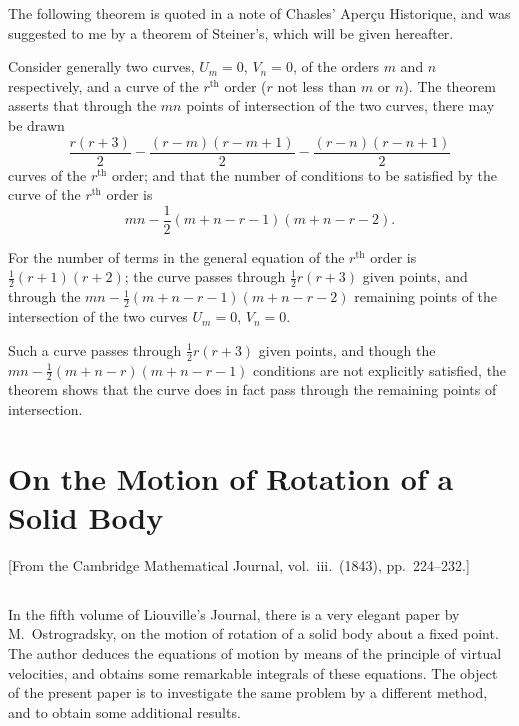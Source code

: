 \documentclass[11pt,a4paper]{book}
\theoremstyle{plain}
\theoremstyle{definition}
\theoremstyle{remark}
\begin{document}
The following theorem is quoted in a note of Chasles' Aper\c{c}u Historique, and was suggested to me by a theorem of Steiner's, which will be given hereafter.

Consider generally two curves, $U_m = 0$, $V_n = 0$, of the orders $m$ and $n$ respectively, and a curve of the $r^{\text{th}}$ order ($r$ not less than $m$ or $n$). The theorem asserts that through the $mn$ points of intersection of the two curves, there may be drawn
\[
\frac{r(r+3)}{2} - \frac{(r-m)(r-m+1)}{2} - \frac{(r-n)(r-n+1)}{2}
\]
curves of the $r^{\text{th}}$ order; and that the number of conditions to be satisfied by the curve of the $r^{\text{th}}$ order is
\[
mn - \frac{1}{2}(m + n - r - 1)(m + n - r - 2).
\]

For the number of terms in the general equation of the $r^{\text{th}}$ order is $\frac{1}{2}(r+1)(r+2)$; the curve passes through $\frac{1}{2}r(r+3)$ given points, and through the $mn - \frac{1}{2}(m+n-r-1)(m+n-r-2)$ remaining points of the intersection of the two curves $U_m = 0$, $V_n = 0$.

Such a curve passes through $\frac{1}{2}r(r+3)$ given points, and though the $mn - \frac{1}{2}(m+n-r)(m+n-r-1)$ conditions are not explicitly satisfied, the theorem shows that the curve does in fact pass through the remaining points of intersection.

\cleardoublepage

\chapter{On the Motion of Rotation of a Solid Body}
\label{chap:paper6}

\begin{center}
\small[From the Cambridge Mathematical Journal, vol.~iii.\ (1843), pp.~224--232.]
\end{center}

\section*{}

In the fifth volume of Liouville's Journal, there is a very elegant paper by M.~Ostrogradsky, on the motion of rotation of a solid body about a fixed point. The author deduces the equations of motion by means of the principle of virtual velocities, and obtains some remarkable integrals of these equations. The object of the present paper is to investigate the same problem by a different method, and to obtain some additional results.
\end{document}
